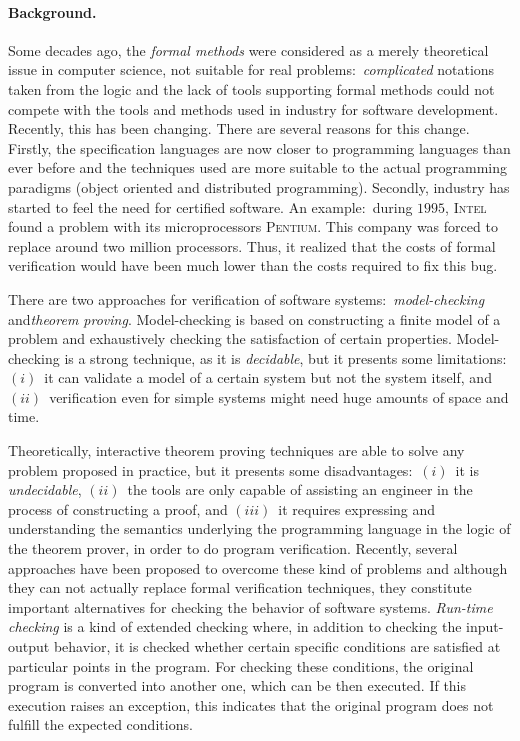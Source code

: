 \documentclass[a4paper]{llncs}
\begin{document}
\paragraph{\bf Background.}
Some decades ago, the \emph{formal methods} were considered as a merely
theoretical issue in computer science, not suitable for real
problems$:$ \emph{complicated} notations taken from the logic and
the lack of tools supporting formal methods could not compete with the
tools and methods used in industry for software development. Recently, 
this has been changing. There are several reasons for this
change. Firstly, the specification languages are now closer to
programming languages than ever before and the techniques used are
more suitable to the actual programming paradigms (object oriented
and distributed programming). Secondly, industry has started to feel
the need for certified software. An example$:$ during
$1995$\cite{Borger99programmer},
\textsc{Intel} found a problem with its microprocessors
\textsc{Pentium}. This company was forced to replace around two
million processors. Thus, it realized that the costs of formal
verification would have been much lower than the costs required to
fix this bug.

There are two approaches for verification of software systems$:$
\textit{model-checking} and\textit{theorem proving}.
Model-checking is based on constructing a finite model of a
problem and exhaustively checking the satisfaction of certain
properties. Model-checking is
a strong technique, as it is \emph{decidable}, but it presents some
limitations$:$ $(i)$~it can validate a
model of a certain system but not the system itself, and
$(ii)$~verification even for simple systems might need huge amounts
of space and time. 

Theoretically, interactive theorem proving techniques are able to
solve any problem proposed in practice, but it presents some
disadvantages$:$ $(i)$~it is \emph{undecidable}, $(ii)$~the tools are
only capable of assisting an engineer in the process of constructing a
proof, and $(iii)$~it requires expressing and understanding the
semantics underlying the
programming language in the logic of the theorem prover, in order to
do program verification. 
Recently, several approaches have been
proposed to overcome these kind of problems and although they can not
actually replace formal verification techniques, they constitute
important alternatives for checking the behavior of software
systems. \emph{Run-time
checking} is a kind of extended checking where, in addition to checking
the input-output behavior, it is checked whether certain specific
conditions are
satisfied at particular points in the program. For checking these
conditions, the original program is converted into another
one,
which can be then executed. If this execution raises an exception,
this indicates that the original program does not fulfill the
expected conditions.
\end{document}
